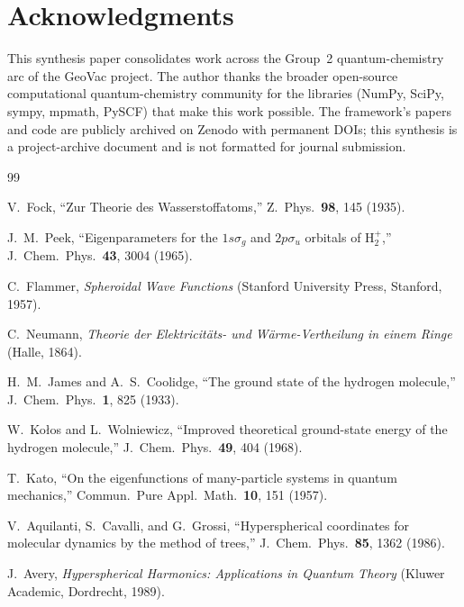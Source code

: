 \documentclass[aps,pra,twocolumn,superscriptaddress,longbibliography]{revtex4-2}
\begin{document}
\section*{Acknowledgments}

This synthesis paper consolidates work across the Group~2
quantum-chemistry arc of the GeoVac project.  The author thanks the
broader open-source computational quantum-chemistry community for the
libraries (NumPy, SciPy, sympy, mpmath, PySCF) that make this work
possible.  The framework's papers and code are publicly archived on
Zenodo with permanent DOIs; this synthesis is a project-archive
document and is not formatted for journal submission.

\begin{thebibliography}{99}


V.~Fock,
``Zur Theorie des Wasserstoffatoms,''
Z.\ Phys.\ \textbf{98}, 145 (1935).

J.~M.~Peek,
``Eigenparameters for the $1s\sigma_g$ and $2p\sigma_u$ orbitals of
H$_2^+$,''
J.\ Chem.\ Phys.\ \textbf{43}, 3004 (1965).

C.~Flammer,
\textit{Spheroidal Wave Functions}
(Stanford University Press, Stanford, 1957).

C.~Neumann,
\textit{Theorie der Elektricit\"ats- und W\"arme-Vertheilung in einem Ringe}
(Halle, 1864).

H.~M.~James and A.~S.~Coolidge,
``The ground state of the hydrogen molecule,''
J.\ Chem.\ Phys.\ \textbf{1}, 825 (1933).

W.~Ko\l{}os and L.~Wolniewicz,
``Improved theoretical ground-state energy of the hydrogen molecule,''
J.\ Chem.\ Phys.\ \textbf{49}, 404 (1968).

T.~Kato,
``On the eigenfunctions of many-particle systems in quantum mechanics,''
Commun.\ Pure Appl.\ Math.\ \textbf{10}, 151 (1957).

V.~Aquilanti, S.~Cavalli, and G.~Grossi,
``Hyperspherical coordinates for molecular dynamics by the method of trees,''
J.\ Chem.\ Phys.\ \textbf{85}, 1362 (1986).

J.~Avery,
\textit{Hyperspherical Harmonics: Applications in Quantum Theory}
(Kluwer Academic, Dordrecht, 1989).


\end{thebibliography}
\end{document}
